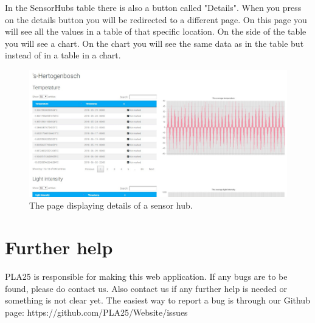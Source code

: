 \documentclass[a4paper]{article}
\begin{document}
\newpage
In the SensorHubs table there is also a button called "Details". When you press on the details button you will be redirected to a different page. On this page you will see all the values in a table of that specific location. On the side of the table you will see a chart. On the chart you will see the same data as in the table but instead of in a table in a chart.
\begin{figure}[h!]
  \caption{The page displaying details of a sensor hub.}
  \centering
  \includegraphics[width=1\textwidth]{admin-details}
\end{figure}

\newpage
\section{Further help}
PLA25 is responsible for making this web application. If any bugs are to be found, please do contact us.
Also contact us if any further help is needed or something is not clear yet.
\newline
\newline
The easiest way to report a bug is through our Github page:
\newline
https://github.com/PLA25/Website/issues
\end{document}
